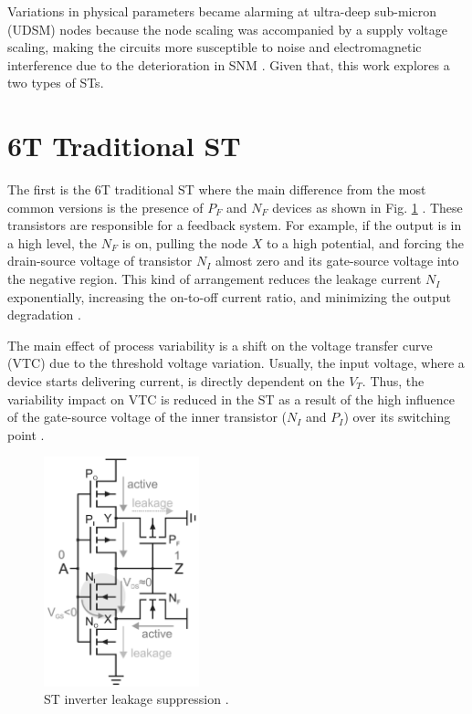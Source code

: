 \documentclass[pgmicro,mestrado,english]{iiufrgs}
\begin{document}
 Variations in physical parameters became alarming at ultra-deep sub-micron (UDSM) nodes because the node scaling was accompanied by a supply voltage scaling, making the circuits more susceptible to noise and electromagnetic interference due to the deterioration in SNM \cite{pal2018circuit}. Given that, this work explores a two types of STs.

 \section{6T Traditional ST}
 The first is the 6T traditional ST where the main difference from the most common versions is the presence of ${P_F}$ and ${N_F}$ devices as shown in Fig. \ref{fig:ST} \cite{doki1984cmos}. These transistors are responsible for a feedback system. For example, if the output is in a high level, the ${N_F}$ is on, pulling the node ${X}$ to a high potential, and forcing the drain-source voltage of transistor ${N_I}$ almost zero and its gate-source voltage into the negative region. This kind of arrangement reduces the leakage current ${N_I}$ exponentially, increasing the on-to-off current ratio, and minimizing the output degradation \cite{lotze2017ultra}.

The main effect of process variability is a shift on the voltage transfer curve (VTC) due to the threshold voltage variation. Usually, the input voltage, where a device starts delivering current, is directly dependent on the $V_T$. Thus, the variability impact on VTC is reduced in the ST as a result of the high influence of the gate-source voltage of the inner transistor ($N_I$ and $P_I$) over its switching point \cite{lotze2017ultra}.

\begin{figure}[H]
  \centering
    \includegraphics[width=0.4\textwidth]{ST.pdf}
     \caption{ST inverter leakage suppression \cite{lotze2017ultra}.}
  \label{fig:ST}
\end{figure}
\end{document}
